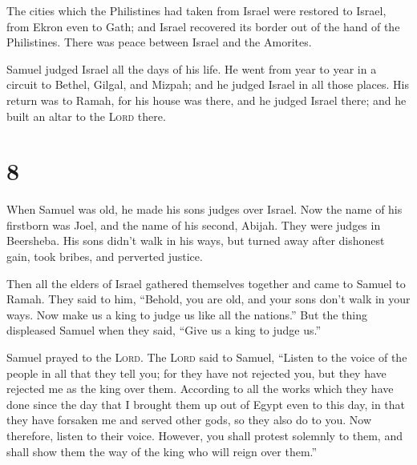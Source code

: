  The cities which the Philistines had taken from Israel
were restored to Israel, from Ekron even to Gath; and Israel recovered
its border out of the hand of the Philistines. There was peace between
Israel and the Amorites.

 Samuel judged Israel all the days of his life.
 He went from year to year in a circuit to Bethel,
Gilgal, and Mizpah; and he judged Israel in all those places.
 His return was to Ramah, for his house was there, and he
judged Israel there; and he built an altar to the \textsc{Lord} there.

\hypertarget{section-7}{%
\section{8}\label{section-7}}

 When Samuel was old, he made his sons judges over Israel.
 Now the name of his firstborn was Joel, and the name of
his second, Abijah. They were judges in Beersheba.  His
sons didn't walk in his ways, but turned away after dishonest gain, took
bribes, and perverted justice.

 Then all the elders of Israel gathered themselves
together and came to Samuel to Ramah.  They said to him,
``Behold, you are old, and your sons don't walk in your ways. Now make
us a king to judge us like all the nations.''  But the
thing displeased Samuel when they said, ``Give us a king to judge us.''

Samuel prayed to the \textsc{Lord}.  The \textsc{Lord}
said to Samuel, ``Listen to the voice of the people in all that they
tell you; for they have not rejected you, but they have rejected me as
the king over them.  According to all the works which they
have done since the day that I brought them up out of Egypt even to this
day, in that they have forsaken me and served other gods, so they also
do to you.  Now therefore, listen to their voice. However,
you shall protest solemnly to them, and shall show them the way of the
king who will reign over them.''

